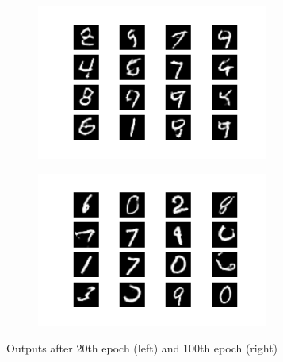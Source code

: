 \documentclass{article}
\begin{document}
\begin{appendices}
\begin{figure}[H]
\centering
\begin{subfigure}{.5\textwidth}
  \centering
  \includegraphics[width=3in]{csci-8110/hw-4/images/generated_plot_e020.png}
  \label{fig:ep20}
\end{subfigure}%
\begin{subfigure}{.5\textwidth}
  \centering
  \includegraphics[width=3in]{csci-8110/hw-4/images/generated_plot_e100.png}
  \label{fig:ep100_2}
\end{subfigure}
\caption{Outputs after 20th epoch (left) and 100th epoch (right)}
\label{fig:ep20-100}
\end{figure}


\end{appendices}
\end{document}

